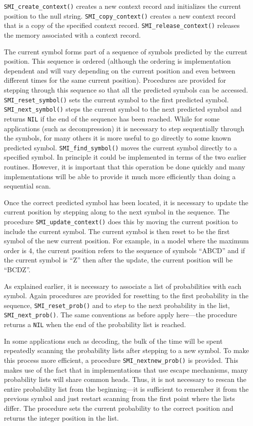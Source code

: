 \documentclass[11pt]{article}
\begin{document}
\verb|SMI_create_context()| creates a new context record and initializes
the current position to the null string. \verb|SMI_copy_context()| creates
a new context record that is a copy of the specified context record.
\verb|SMI_release_context()| releases the memory associated with a context
record.

The current symbol forms part of a sequence of symbols predicted by the
current position. This sequence is ordered (although the ordering is
implementation dependent and will vary depending on the current position and
even between different times for the same current position). Procedures are
provided for stepping through this sequence so that all the predicted
symbols can be accessed. \verb|SMI_reset_symbol()| sets the current symbol
to the first predicted symbol. \verb|SMI_next_symbol()| steps the current
symbol to the next predicted symbol and returns \verb|NIL| if the end of the
sequence has been reached. While for some applications (such as
decompression) it is necessary to step sequentially through the symbols, for
many others it is more useful to go directly to some known predicted symbol.
\verb|SMI_find_symbol()| moves the current symbol directly to a specified
symbol. In principle it could be implemented in terms of the two earlier
routines. However, it is important that this operation be done quickly and
many implementations will be able to provide it much more efficiently than
doing a sequential scan.

Once the correct predicted symbol has been located, it is necessary to update
the current position by stepping along to the next symbol in the sequence.
The procedure \verb|SMI_update_context()| does this by moving the current
position to include the current symbol. The current symbol is then reset to
be the first symbol of the new current position. For example, in a model
where the maximum order is 4, the current position refers to the sequence of
symbols ``ABCD'' and if the current symbol is ``Z'' then after the update, the
current position will be ``BCDZ''.

As explained earlier, it is necessary to associate a list of probabilities
with each symbol. Again procedures are provided for resetting to the first
probability in the sequence, \verb|SMI_reset_prob()| and to step to the
next probability in the list, \verb|SMI_next_prob()|. The same conventions
as before apply here---the procedure returns a \verb|NIL| when the end of the
probability list is reached.

In some applications such as decoding, the bulk of the time will be spent
repeatedly scanning the probability lists after stepping to a new
symbol. To make this process more efficient, a procedure
\verb|SMI_nextnew_prob()| is provided. This makes use of the fact that in
implementations that use escape mechanisms, many probability lists will share
common heads. Thus, it is not necessary to rescan the entire probability list
from the beginning---it is sufficient to remember it from the previous symbol
and just restart scanning from the first point where the lists differ. The
procedure sets the current probability to the correct position and returns
the integer position in the list.
\end{document}
